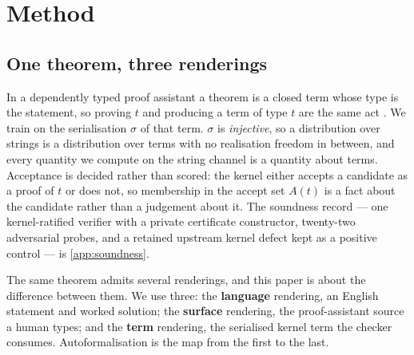 %

\section{Method}
\label{sec:method}

\subsection{One theorem, three renderings}
\label{sec:method:object}

In a dependently typed proof assistant a theorem is a closed term whose type is
the statement, so proving \(t\) and producing a term of type \(t\) are the same
act \citep{demoura2021lean4, barendregt2001proofassistants}.
We train on the serialisation \(\sigma\) of that term.
\(\sigma\) is \emph{injective}, so a distribution over strings is a distribution
over terms with no realisation freedom in between, and every quantity we compute
on the string channel is a quantity about terms.
Acceptance is decided rather than scored:
the kernel either accepts a candidate as a proof of \(t\) or does not, so
membership in the accept set \(A(t)\) is a fact about the candidate rather than
a judgement about it.
The soundness record --- one kernel-ratified verifier with a private certificate
constructor, twenty-two adversarial probes, and a retained upstream kernel
defect kept as a positive control --- is \cref{app:soundness}.

The same theorem admits several renderings, and this paper is about the
difference between them.
We use three:
the \textbf{language} rendering, an English statement and worked solution;
the \textbf{surface} rendering, the proof-assistant source a human types;
and the \textbf{term} rendering, the serialised kernel term the checker
consumes.
Autoformalisation is the map from the first to the last.

